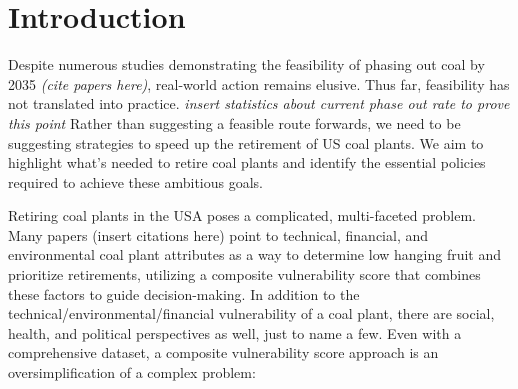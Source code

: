 \section{Introduction}

Despite numerous studies demonstrating the feasibility of phasing out coal by 2035 \textit{(cite papers here)}, 
real-world action remains elusive. Thus far, feasibility has not translated into practice. 
\textit{insert statistics about current phase out rate to prove this point} 
Rather than suggesting a feasible route forwards, we need to be suggesting strategies to speed up the retirement of US coal plants. 
We aim to highlight what's needed to retire coal plants and identify the essential policies required to achieve these ambitious goals.

%     
%     

Retiring coal plants in the USA poses a complicated, multi-faceted problem. Many papers (insert citations here) point to technical, financial, and environmental 
coal plant attributes as a way to determine low hanging fruit and prioritize retirements, utilizing a composite vulnerability score that combines these factors to guide 
decision-making. In addition to the technical/environmental/financial vulnerability of a coal plant, there are social, health, and political perspectives as well, just 
to name a few. Even with a comprehensive dataset, a composite vulnerability score approach is an oversimplification of a complex problem:

